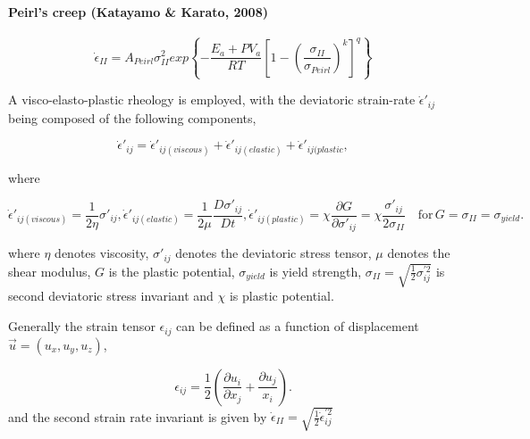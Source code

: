 \paragraph{Peirl's creep (Katayamo \& Karato, 2008)}
\begin{equation}\label{eqs:peirls_strain_rate}
\dot{\epsilon}_{II} = A_{Peirl} \sigma_{II}^2 exp \left\lbrace -\dfrac{E_a + P V_a}{R T}  \left[ 1- \left( \dfrac{\sigma_{II}}{\sigma_{Peirl}} \right) ^k \right] ^q \right\rbrace
\end{equation}

A visco-elasto-plastic rheology is employed, with the deviatoric strain-rate $\dot{\epsilon}'_{ij}$ being composed of the following components,

\begin{equation}
\dot{\epsilon}'_{ij} = \dot{\epsilon}'_{ij(viscous)} + \dot{\epsilon}'_{ij(elastic)} + \dot{\epsilon}'_{ij(plastic},
\end{equation}

where

\begin{subequations}
\begin{equation}
\dot{\epsilon}'_{ij(viscous)} = \dfrac{1}{2 \eta} \sigma'_{ij},
\end{equation}
\begin{equation}
\dot{\epsilon}'_{ij(elastic)} = \dfrac{1}{2 \mu} \dfrac{D \sigma'_{ij}}{D t},
\end{equation}
\begin{equation}
\dot{\epsilon}'_{ij(plastic)} = \chi \dfrac{\partial G}{\partial \sigma'_{ij}} = \chi \dfrac{\sigma'_{ij}}{2 \sigma_{II}} \quad \text{for}\, G = \sigma_{II} = \sigma_{yield}.
\end{equation}
\end{subequations}

where $\eta$ denotes viscosity, $\sigma'_{ij}$ denotes the deviatoric stress tensor, $\mu$ denotes the shear modulus, $G$ is the plastic potential, $\sigma_{yield}$ is yield strength, $\sigma_{II}=\sqrt{\frac{1}{2}\sigma_{ij}^{'2}}$ is second deviatoric stress invariant and $\chi$ is plastic potential.

Generally the strain tensor $\epsilon_{ij}$ can be defined as a function of displacement $\vec{u} = (u_x, u_y, u_z)$,

\begin{equation}\label{strain}
\epsilon_{ij} = \dfrac{1}{2} \left(\dfrac{\partial u_i}{\partial x_j} + \dfrac{\partial u_j}{x_i}\right).
\end{equation}
and the second strain rate invariant is given by $\dot{\epsilon}_{II} = \sqrt{\frac{1}{2}\dot{\epsilon}_{ij}^{'2}}$

